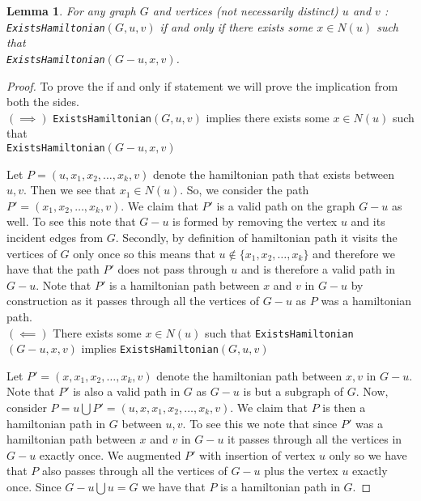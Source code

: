 \documentclass[answers]{exam}
\newtheorem{lemma}{Lemma}
\begin{document}
\begin{questions}
\begin{parts}
\begin{solution}
\begin{lemma}
For any graph $G$ and vertices (not necessarily distinct) $u$ and $v$ :\\ \texttt{ExistsHamiltonian}$(G, u, v)$ if and only if there exists some $x \in N(u)$ such that \\ \texttt{ExistsHamiltonian}$(G - u, x, v)$.
\end{lemma}
\begin{proof}
To prove the if and only if statement we will prove the implication from both the sides.\\

\textbf{$(\implies)$} \texttt{ExistsHamiltonian}$(G, u, v)$ implies there exists some $x \in N(u)$ such that \\ \texttt{ExistsHamiltonian}$(G-u, x, v)$

Let $P = (u, x_1, x_2, \ldots, x_k, v)$ denote the hamiltonian path that exists between $u,v$. Then we see that $x_1 \in N(u)$. So, we consider the path $P' = (x_1, x_2, \ldots, x_k, v)$. We claim that $P'$ is a valid path on the graph $G-u$ as well. To see this note that $G-u$ is formed by removing the vertex $u$ and its incident edges from $G$. Secondly, by definition of hamiltonian path it visits the vertices of $G$ only once so this means that $u \notin \{x_1, x_2, \ldots, x_k\}$ and therefore we have that the path $P'$ does not pass through $u$ and is therefore a valid path in $G-u$. Note that $P'$ is a hamiltonian path between $x$ and $v$ in $G-u$ by construction as it passes through all the vertices of $G-u$ as $P$ was a hamiltonian path.\\

\textbf{$(\impliedby)$} There exists some $x \in N(u)$ such that \texttt{ExistsHamiltonian}$(G-u, x, v)$ implies \texttt{ExistsHamiltonian}$(G, u, v)$

Let $P' = (x, x_1, x_2, \ldots, x_k, v)$ denote the hamiltonian path between $x,v$ in $G-u$. Note that $P'$ is also a valid path in $G$ as $G-u$ is but a subgraph of $G$. Now, consider $P = u \bigcup P' = (u, x, x_1, x_2, \ldots, x_k, v)$. We claim that $P$ is then a hamiltonian path in $G$ between $u,v$. To see this we note that since $P'$ was a hamiltonian path between $x$ and $v$ in $G-u$ it passes through all the vertices in $G-u$ exactly once. We augmented $P'$ with insertion of vertex $u$ only so we have that $P$ also passes through all the vertices of $G-u$ plus the vertex $u$ exactly once. Since $G-u \bigcup u = G$ we have that $P$ is a hamiltonian path in $G$.


\end{proof}
\end{solution}
\end{parts}
\end{questions}
\end{document}
